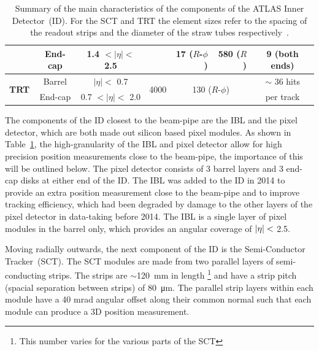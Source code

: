 {\begin{table}[!htb]
\begin{tabular}{|cc||c|c|rr|c|}
                         & End-cap   &        1.4  $\lt |\eta| \lt$  2.5    &                   &  17 ($R$-$\phi$)        & 580 ($R$)          & 9 (both ends)    \\ %
  \hline                                                                                                                                                
  \multirow{2}{*}{\textbf{TRT}}   & Barrel    & $|\eta| \lt$  0.7             & \multirow{2}{*}{4000}     & \multicolumn{2}{c|}{\multirow{2}{*}{130 ($R$-$\phi$)}}     & $\sim$ 36 hits    \\ %
                         & End-cap   &         0.7  $\lt |\eta| \lt$  2.0    &                  &                         &                  & per track        \\ %
  \hline
\end{tabular}
\caption[Summary of the main characteristics of the components of the ATLAS Inner Detector.]
        {\label{tab:det-ID}Summary of the main characteristics of the components of the ATLAS Inner Detector~(ID).
          For the SCT and TRT the element sizes refer to the spacing of the readout strips and the diameter of the straw tubes respectively~\cite{det-ATLAS_Exp,det-ID_table}.}
         \vspace{-1em}
\end{table}
}

The components of the ID closest to the beam-pipe are the IBL and the pixel detector,
which are both made out silicon based pixel modules.
As shown in Table~\ref{tab:det-ID}, the high-granularity of the IBL and pixel detector allow for high precision position measurements
close to the beam-pipe, the importance of this will be outlined below.
The pixel detector consists of 3 barrel layers and 3 end-cap disks at either end of the ID.
The IBL was added to the ID in 2014 to provide an extra position measurement close to the beam-pipe
and to improve tracking efficiency,
which had been degraded by damage to the other layers of the pixel detector in data-taking before 2014.
The IBL is a single layer of pixel modules in the barrel only, which provides an angular coverage of $|\eta|\nobreak<$ 2.5.

Moving radially outwards, the next component of the ID is the Semi-Conductor Tracker~(SCT).
The SCT modules are made from two parallel layers of semi-conducting strips.
The strips are $\sim$\SI{120}{\mm} in length \footnote{ This number varies for the various parts of the SCT}
and have a strip pitch (spacial separation between strips) of \SI{80}{\micro\metre}.
The parallel strip layers within each module have a 40 mrad angular offset along their common normal
such that each module can produce a 3D position measurement.

